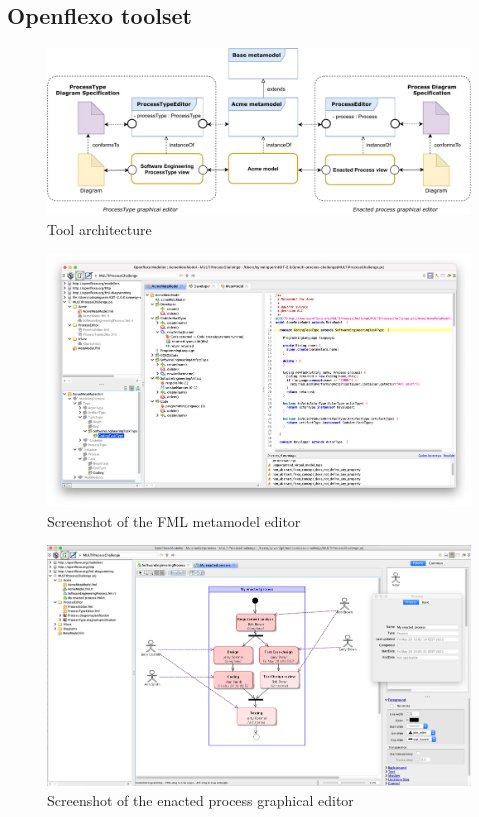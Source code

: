 \subsection{Openflexo toolset}
\label{subsec:tooling}

\begin{figure}
 \centering
     \includegraphics[width=0.9 \textwidth]{Figures/ToolingArchitecture-1.5.pdf}
     \caption{Tool architecture}
    \label{fig:ToolingArchitecture}
\end{figure}

\begin{figure}
 \centering
     \includegraphics[width=\textwidth]{Figures/ScreenshotFMLEditor.png}
     \caption{Screenshot of the FML metamodel editor}
    \label{fig:ScreenshotFMLEditor}
\end{figure}

\begin{figure}
 \centering
     \includegraphics[width=\textwidth]{Figures/ScreenshotEnactedProcessEditor.png}
     \caption{Screenshot of the enacted process graphical editor}
    \label{fig:ScreenshotEnactedProcessEditor}
\end{figure}

